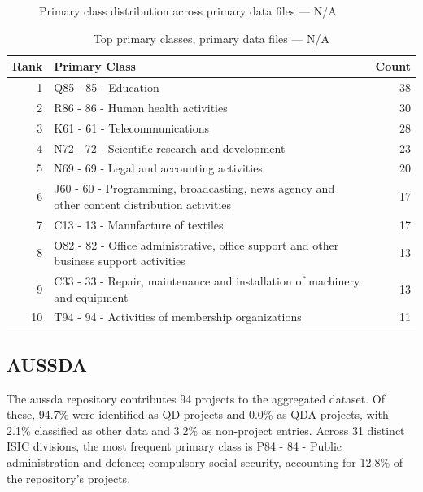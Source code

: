 \clearpage

\begin{figure}[H]
    \centering
    
    \caption{Primary class distribution across primary data files --- N/A}
\end{figure}

\begin{table}[H]
    \centering
    \begin{tabular}{r p{10cm} r}
    \hline
    \textbf{Rank} & \textbf{Primary Class} & \textbf{Count} \\
    \hline
    1 & Q85 - 85 - Education & 38 \\
    2 & R86 - 86 - Human health activities & 30 \\
    3 & K61 - 61 - Telecommunications & 28 \\
    4 & N72 - 72 - Scientific research and development & 23 \\
    5 & N69 - 69 - Legal and accounting activities & 20 \\
    6 & J60 - 60 - Programming, broadcasting, news agency and other content distribution activities & 17 \\
    7 & C13 - 13 - Manufacture of textiles & 17 \\
    8 & O82 - 82 - Office administrative, office support and other business support activities & 13 \\
    9 & C33 - 33 - Repair, maintenance and installation of machinery and equipment & 13 \\
    10 & T94 - 94 - Activities of membership organizations & 11 \\
    \hline
    \end{tabular}
    \caption{Top primary classes, primary data files --- N/A}
\end{table}

\clearpage

\subsection{AUSSDA}


The aussda repository contributes 94 projects to the aggregated dataset. Of these, 94.7\% were identified as QD projects and 0.0\% as QDA projects, with 2.1\% classified as other data and 3.2\% as non-project entries. Across 31 distinct ISIC divisions, the most frequent primary class is P84 - 84 - Public administration and defence; compulsory social security, accounting for 12.8\% of the repository's projects.


